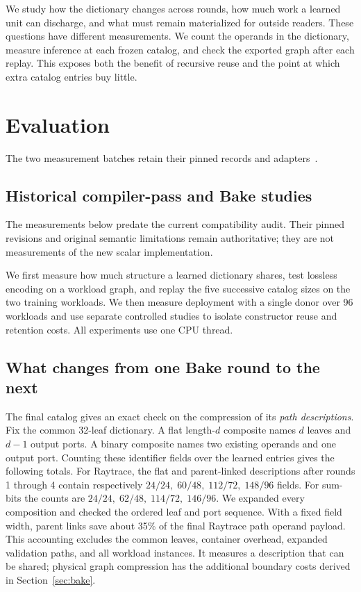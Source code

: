 \documentclass[10pt,letterpaper]{article}
\begin{document}


We study how the dictionary changes across rounds, how much work a learned unit can discharge, and what must remain materialized for outside readers. These questions have different measurements. We count the operands in the dictionary, measure inference at each frozen catalog, and check the exported graph after each replay. This exposes both the benefit of recursive reuse and the point at which extra catalog entries buy little.

\section{Evaluation}\label{sec:eval}


The two measurement batches retain their pinned records and adapters~\cite{currentartifact,native3artifact}.
\subsection{Historical compiler-pass and Bake studies}
The measurements below predate the current compatibility audit. Their pinned revisions and original semantic limitations remain authoritative; they are not measurements of the new scalar implementation.

We first measure how much structure a learned dictionary shares, test lossless encoding on a workload graph, and replay the five successive catalog sizes on the two training workloads. We then measure deployment with a single donor over 96 workloads and use separate controlled studies to isolate constructor reuse and retention costs. All experiments use one CPU thread.

\subsection{What changes from one Bake round to the next}
The final catalog gives an exact check on the compression of its \emph{path descriptions}. Fix the common 32-leaf dictionary. A flat length-\(d\) composite names \(d\) leaves and \(d-1\) output ports. A binary composite names two existing operands and one output port. Counting these identifier fields over the learned entries gives the following totals. For Raytrace, the flat and parent-linked descriptions after rounds 1 through 4 contain respectively \(24/24,\;60/48,\;112/72,\;148/96\) fields. For sum-bits the counts are \(24/24,\;62/48,\;114/72,\;146/96\). We expanded every composition and checked the ordered leaf and port sequence. With a fixed field width, parent links save about 35\% of the final Raytrace path operand payload. This accounting excludes the common leaves, container overhead, expanded validation paths, and all workload instances. It measures a description that can be shared; physical graph compression has the additional boundary costs derived in Section~\ref{sec:bake}.
\end{document}
